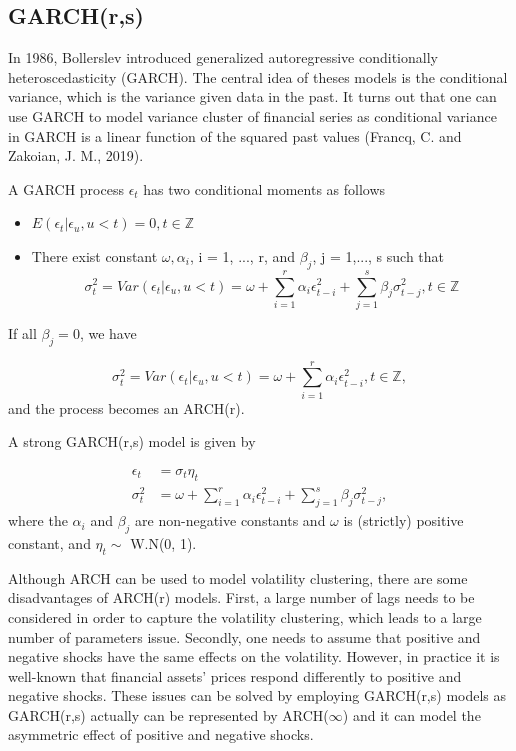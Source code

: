 \documentclass[12pt,a4paper]{article}
\numberwithin{equation}{section}
\begin{document}
\subsection{GARCH(r,s)}
In 1986, Bollerslev introduced generalized autoregressive conditionally heteroscedasticity (GARCH). The central idea of theses models is the conditional variance, which is the variance given data in the past. It turns out that one can use GARCH to model variance cluster of financial series as conditional variance in GARCH is a linear function of the squared past values (Francq, C. and Zakoian, J. M., 2019). 

A GARCH process $\epsilon_t$ has two conditional moments as follows

\begin{itemize}
\item $E(\epsilon_t | \epsilon_u, u < t) = 0, t \in \mathbb{Z}$
\item There exist constant $\omega, \alpha_i$, i = 1, ..., r, and $\beta_j$, j = 1,..., s such that
\[\sigma_t^2 = Var(\epsilon_t | \epsilon_u, u < t) = \omega + \sum_{i=1}^{r} \alpha_i \epsilon_{t-i}^2 + \sum_{j=1}^{s} \beta_j \sigma_{t-j}^2, t \in \mathbb{Z}\]
\end{itemize}

If all $\beta_j = 0$, we have

 \[\sigma_t^2 = Var(\epsilon_t | \epsilon_u, u < t) = \omega + \sum_{i=1}^{r} \alpha_i \epsilon_{t-i}^2, t \in \mathbb{Z},\]
 and the process becomes an ARCH(r). 
 
 A strong GARCH(r,s) model is given by
 
 \begin{align*}
 \epsilon_t &= \sigma_t \eta_t \\
 \sigma_t^2 &=  \omega + \sum_{i=1}^{r} \alpha_i \epsilon_{t-i}^2 + \sum_{j=1}^{s} \beta_j \sigma_{t-j}^2,
 \end{align*}
 where the $\alpha_i$ and $\beta_j$ are non-negative constants and $\omega$ is (strictly) positive constant, and $\eta_t \sim$ W.N(0, 1).
 
 Although ARCH can be used to model volatility clustering, there are some disadvantages of ARCH(r) models. First,  a large number of lags needs to be considered in order to capture the volatility clustering, which leads to a large number of parameters issue. Secondly, one needs to assume that positive and negative shocks have the same effects on the volatility. However, in practice it is well-known that financial assets' prices respond differently to positive and negative shocks. These issues can be solved by employing GARCH(r,s) models as GARCH(r,s) actually can be represented by ARCH($\infty$) and it can model the asymmetric effect of positive and negative shocks.
 
\end{document}
